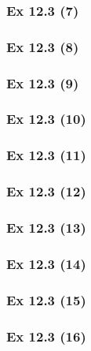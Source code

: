 \subsubsection{Ex 12.3 (7)}\label{sec:Ex_12.3.7}

\subsubsection{Ex 12.3 (8)}\label{sec:Ex_12.3.8}

\subsubsection{Ex 12.3 (9)}\label{sec:Ex_12.3.9}

\subsubsection{Ex 12.3 (10)}\label{sec:Ex_12.3.10}

\newpage		%

\subsubsection{Ex 12.3 (11)}\label{sec:Ex_12.3.11}

\subsubsection{Ex 12.3 (12)}\label{sec:Ex_12.3.12}

\subsubsection{Ex 12.3 (13)}\label{sec:Ex_12.3.13}

\subsubsection{Ex 12.3 (14)}\label{sec:Ex_12.3.14}

\subsubsection{Ex 12.3 (15)}\label{sec:Ex_12.3.15}

\subsubsection{Ex 12.3 (16)}\label{sec:Ex_12.3.16}

